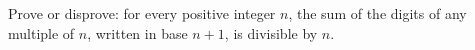 Prove or disprove: for every positive integer $n$, the sum of the digits of any multiple of $n$, written in base $n+1$, is divisible by $n$.

